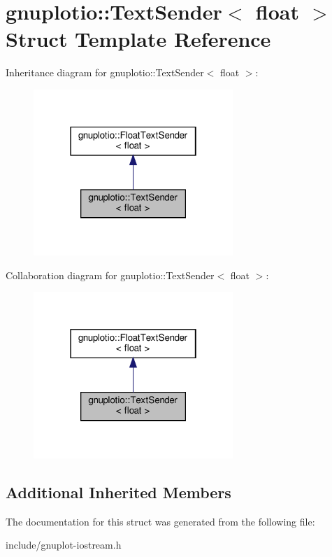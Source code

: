 \hypertarget{structgnuplotio_1_1TextSender_3_01float_01_4}{}\section{gnuplotio\+:\+:Text\+Sender$<$ float $>$ Struct Template Reference}
\label{structgnuplotio_1_1TextSender_3_01float_01_4}


Inheritance diagram for gnuplotio\+:\+:Text\+Sender$<$ float $>$\+:\nopagebreak
\begin{figure}[H]
\begin{center}
\leavevmode
\includegraphics[width=214pt]{structgnuplotio_1_1TextSender_3_01float_01_4__inherit__graph}
\end{center}
\end{figure}


Collaboration diagram for gnuplotio\+:\+:Text\+Sender$<$ float $>$\+:\nopagebreak
\begin{figure}[H]
\begin{center}
\leavevmode
\includegraphics[width=214pt]{structgnuplotio_1_1TextSender_3_01float_01_4__coll__graph}
\end{center}
\end{figure}
\subsection*{Additional Inherited Members}


The documentation for this struct was generated from the following file\+:\begin{DoxyCompactItemize}
\item 
include/gnuplot-\/iostream.\+h\end{DoxyCompactItemize}
